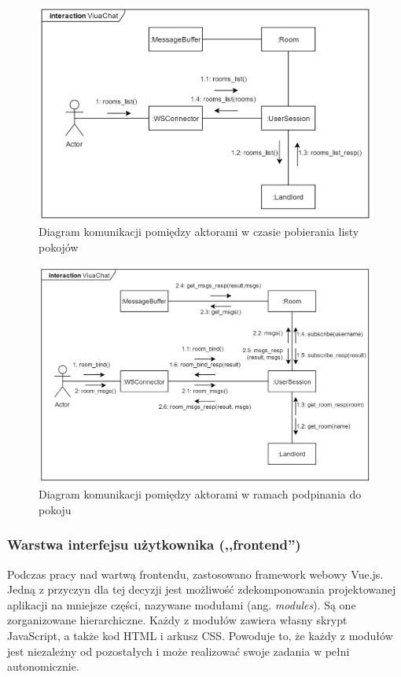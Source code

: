 \begin{figure}[!htp]
	\centering
	\includegraphics[width=\textwidth]{chat/fig/com-diag-rooms-list}
	\caption{Diagram komunikacji pomiędzy aktorami w czasie pobierania listy pokojów}
	\label{com-diag-rooms-list}
\end{figure}

\begin{figure}[!htp]
	\centering
	\includegraphics[width=\textwidth]{chat/fig/com-diag-room-bind}
	\caption{Diagram komunikacji pomiędzy aktorami w ramach podpinania do pokoju}
	\label{com-diag-room-bind}
\end{figure}


\newpage

\subsubsection{Warstwa interfejsu użytkownika (,,frontend'')}
Podczas pracy nad wartwą frontendu, zastosowano framework webowy Vue.js. Jedną
z przyczyn dla tej decyzji jest możliwość zdekomponowania projektowanej aplikacji na mniejsze części, nazywane modułami (ang. \textit{modules}). Są one zorganizowane hierarchiczne. Każdy z modułów zawiera własny skrypt JavaScript, a także kod HTML i arkusz CSS. Powoduje to, że każdy z modułów jest niezależny od pozostałych i może realizować swoje zadania w pełni autonomicznie.

